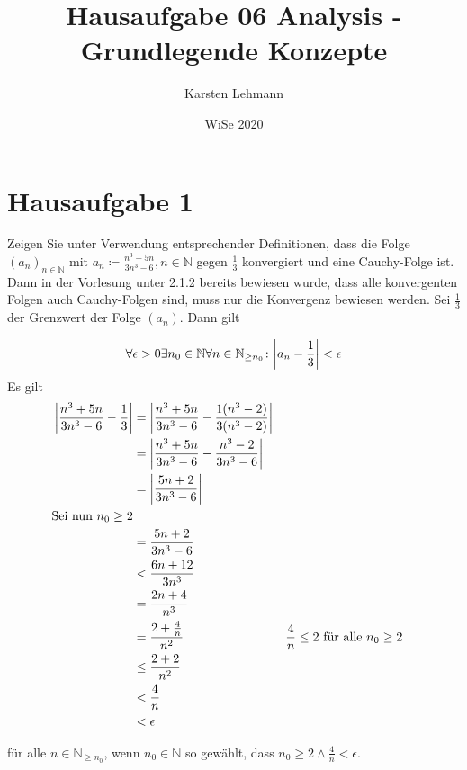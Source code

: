 \documentclass{article}
\author{Karsten Lehmann}
\date{WiSe 2020}
\title{Hausaufgabe 06 Analysis - Grundlegende Konzepte}
\begin{document}
\section*{Hausaufgabe 1}

Zeigen Sie unter Verwendung entsprechender Definitionen, dass die Folge $(a_n)_{n \in \mathbb{N}}$ mit
$a_n \coloneqq \frac{n^3 + 5n}{3n^3 - 6}, n \in \mathbb{N}$ gegen $\frac{1}{3}$ konvergiert und eine
Cauchy-Folge ist. \\

\noindent
Dann in der Vorlesung unter 2.1.2 bereits bewiesen wurde, dass alle konvergenten Folgen auch Cauchy-Folgen sind,
muss nur die Konvergenz bewiesen werden. Sei $\frac{1}{3}$ der Grenzwert der Folge $(a_n)$. Dann gilt

\[
  \forall \epsilon > 0 \exists n_0 \in \mathbb{N} \forall n \in \mathbb{N}_{\geq n_0} \colon \abs{a_n - \frac{1}{3}} < \epsilon
\]
Es gilt
\begin{align*}
  \abs{\frac{n^3 + 5n}{3n^3 - 6} - \frac{1}{3}} &= \abs{\frac{n^3 + 5n}{3n^3 - 6} - \frac{1(n^3 - 2)}{3(n^3 - 2)}} \\
                                                &= \abs{\frac{n^3 + 5n}{3n^3 - 6} - \frac{n^3 - 2}{3n^3 - 6}} \\
                                                &= \abs{\frac{5n + 2}{3n^3 - 6}} \\
  \text{Sei nun $n_0 \geq 2$} \\
                                                &= \frac{5n + 2}{3n^3 - 6} \\
                                                &< \frac{6n + 12}{3n^3} \\
                                                &= \frac{2n + 4}{n^3} \\
                                                &= \frac{2 + \frac{4}{n}}{n^2} && \frac{4}{n} \leq 2 \text{ für alle } n_0 \geq 2 \\
                                                &\leq \frac{2 + 2}{n^2} \\
                                                &< \frac{4}{n} \\
                                                &< \epsilon
\end{align*}

für alle $n \in \mathbb{N}_{\geq n_0}$, wenn $n_0 \in \mathbb{N}$ so gewählt, dass $n_0 \geq 2 \land \frac{4}{n} < \epsilon$. \\
\end{document}
